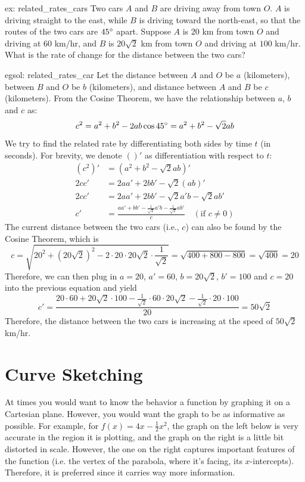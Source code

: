 \begin{ex}[]{ex: related_rates_cars}
    Two cars $A$ and $B$ are driving away from town $O$. $A$ is driving straight to the east, while $B$ is driving toward the north-east, so that the routes of the two cars are $45\degree$ apart.  Suppose $A$ is $20$ km from town $O$ and driving at $60$ km/hr, and $B$ is $20\sqrt{2}$ km from town $O$ and driving at $100$ km/hr.  What is the rate of change for the distance between the two cars?
\end{ex}

\begin{exsol}[]{egsol: related_rates_car}
    Let the distance between $A$ and $O$ be $a$ (kilometers), between $B$ and $O$ be $b$ (kilometers), and distance between $A$ and $B$ be $c$ (kilometers).  From the Cosine Theorem, we have the relationship between $a$, $b$ and $c$ as:
    \[c^2 = a^2 + b^2 - 2ab\cos 45 \degree = a^2 + b^2 - \sqrt{2}ab\]
    We try to find the related rate by differentiating both sides by time $t$ (in seconds).  For brevity, we denote $()'$ as differentiation with respect to $t$:
    \begin{align*}
        (c^2)' &= (a^2 + b^2 - \sqrt{2}ab)'\\
        2cc' &= 2aa' + 2bb' - \sqrt{2}(ab)'\\
        2cc' &= 2aa' + 2bb' - \sqrt{2}a'b - \sqrt{2}ab'\\
        c' &= \frac{aa' + bb' - \frac{1}{\sqrt{2}}a'b - \frac{1}{\sqrt{2}}ab'}{c} \quad (\text{if } c \ne 0)
    \end{align*}
    The current distance between the two cars (i.e., $c$) can also be found by the Cosine Theorem, which is
    \[c = \sqrt{20^2+(20\sqrt{2})^2-2 \cdot 20 \cdot 20\sqrt{2} \cdot \frac{1}{\sqrt{2}}} = \sqrt{400+800-800} = \sqrt{400} = 20\]
    Therefore, we can then plug in $a = 20$, $a' = 60$, $b = 20\sqrt{2}$, $b' = 100$ and $c = 20$ into the previous equation and yield
    \[c' = \frac{20 \cdot 60 + 20\sqrt{2} \cdot 100 - \frac{1}{\sqrt{2}}\cdot 60\cdot 20\sqrt{2} - \frac{1}{\sqrt{2}} \cdot 20 \cdot 100}{20} = 50\sqrt{2}\]
    Therefore, the distance between the two cars is increasing at the speed of $50\sqrt{2}$ km/hr.
\end{exsol}

\pagebreak
\section{Curve Sketching}
At times you would want to know the behavior a function by graphing it on a Cartesian plane.  However, you would want the graph to be as informative as possible.  For example, for $f(x) = 4x - \frac{1}{2}x^2$, the graph on the left below is very accurate in the region it is plotting, and the graph on the right is a little bit distorted in scale.  However, the one on the right captures important features of the function (i.e. the vertex of the parabola, where it's facing, its $x$-intercepts). Therefore, it is preferred since it carries way more information.

